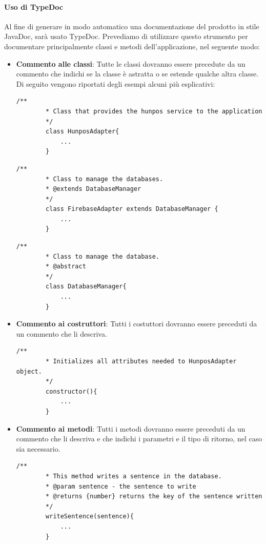 \documentclass[11pt,a4paper]{article}
\begin{document}
{	\paragraph{Uso di TypeDoc}
	Al fine di generare in modo automatico una documentazione del prodotto in stile JavaDoc, sarà usato TypeDoc.
	Prevediamo di utilizzare questo strumento per documentare principalmente classi e metodi dell'applicazione, nel seguente modo:
	\begin{itemize}
		\item \textbf{Commento alle classi}: Tutte le classi dovranno essere precedute da un commento che indichi se la classe è astratta o se estende qualche altra classe. Di seguito vengono riportati degli esempi alcuni più esplicativi:
		\begin{lstlisting}[caption=Commento ad una classe semplice]
		/**
		* Class that provides the hunpos service to the application
		*/
		class HunposAdapter{
			...
		}
		\end{lstlisting}
			\begin{lstlisting}[caption=Commento ad una classe che ne estende un altra]
		/**
		* Class to manage the databases.
		* @extends DatabaseManager
		*/
		class FirebaseAdapter extends DatabaseManager {
			...
		}
		\end{lstlisting}
		\begin{lstlisting}[caption=Commento ad una classe astratta]
		/**
		* Class to manage the database.
		* @abstract
		*/
		class DatabaseManager{
			...
		}
		\end{lstlisting}
		\item \textbf{Commento ai costruttori}:
		Tutti i costuttori dovranno essere preceduti da un commento che li descriva. 
		\begin{lstlisting}[caption=Commento ad una classe astratta]
		/**
		* Initializes all attributes needed to HunposAdapter object.
		*/
		constructor(){
			...
		}
		\end{lstlisting}
		\item \textbf{Commento ai metodi}:
		Tutti i metodi dovranno essere preceduti da un commento che li descriva e che indichi i parametri e il tipo di ritorno, nel caso sia necessario.
		\begin{lstlisting}[caption=Commento ad un metodo]
		/**
		* This method writes a sentence in the database.
		* @param sentence - the sentence to write
		* @returns {number} returns the key of the sentence written
		*/
		writeSentence(sentence){
			...
		}
		
		\end{lstlisting}
	\end{itemize}
	
}
\end{document}
